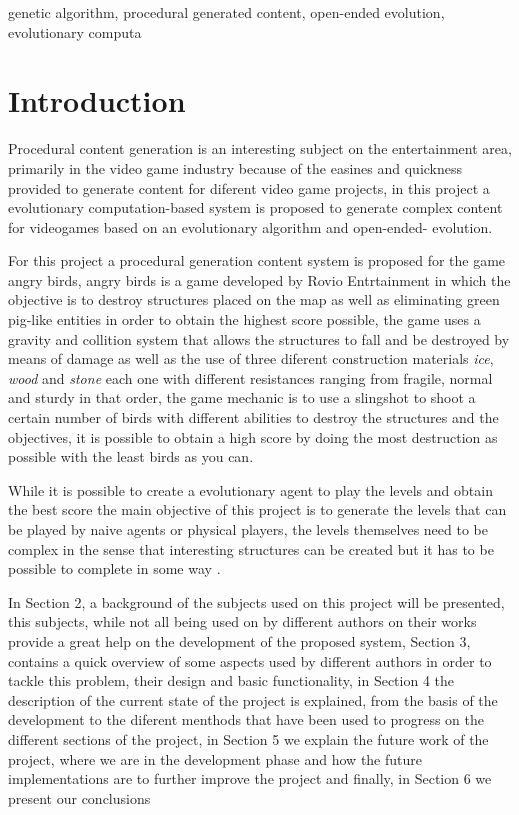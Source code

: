 \documentclass[conference]{IEEEtran}
\begin{document}
\begin{IEEEkeywords}
genetic algorithm, procedural generated content, open-ended evolution, evolutionary computa
\end{IEEEkeywords}

\section{Introduction}
Procedural content generation is an interesting subject on the entertainment area, primarily in the video game industry because of the easines and quickness provided to generate content for diferent video game projects, in this project a evolutionary computation-based system is proposed to generate complex content for videogames based on an evolutionary algorithm and open-ended- evolution.

For this project a procedural generation content system is proposed for the game angry birds, angry birds is a game developed by Rovio Entrtainment in which the objective is to destroy structures placed on the map as well as eliminating green pig-like entities in order to obtain the highest score possible, the game uses a gravity and collition system that allows the structures to fall and be destroyed by means of damage as well as the use of three diferent construction materials \textit{ice}, \textit{wood} and \textit{stone} each one with different resistances ranging from fragile, normal and sturdy in that order, the game mechanic is to use a slingshot to shoot a certain number of birds with different abilities to destroy the structures and the objectives, it is possible to obtain a high score by doing the most destruction as possible with the least birds as you can. \cite{RovioEntertainmentCorporation2009}

While it is possible to create a evolutionary agent to play the levels and obtain the best score the main objective of this project is to generate the levels that can be played by naive agents or physical players, the levels themselves need to be complex in the sense that interesting structures can be created but it has to be possible to complete in some way \cite{Stephenson,Stephenson2018}.

In Section 2, a background of the subjects used on this project will be presented, this subjects, while not all being used on by different authors on their works provide a great help on the development of the proposed system, Section 3, contains a quick overview of some aspects used by different authors in order to tackle this problem, their design and basic functionality, in Section 4 the description of the current state of the project is explained, from the basis of the development to the diferent menthods that have been used to progress on the different sections of the project, in Section 5 we explain the future work of the project, where we are in the development phase and how the future implementations are to further improve the project and finally, in Section 6 we present our conclusions
 
\end{document}
